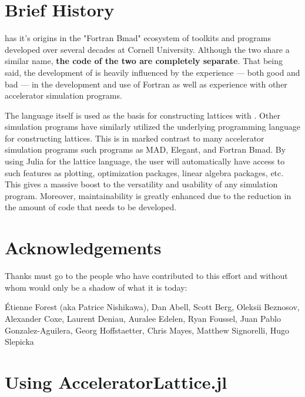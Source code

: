 \section{Brief History}

\bmadjl has it's origins in the "Fortran Bmad"\cite{Sagan:Bmad2006} ecosystem of toolkits and programs developed over several
decades at Cornell University. Although the two share a similar name, {\bf the code of the two are
completely separate}. That being said, the development of \accellat is heavily influenced by the 
experience --- both good and bad --- in the development and use of Fortran \bmad as well as experience
with other accelerator simulation programs.

The \julia language itself is used as the basis for constructing lattices with \accellat. 
Other simulation programs
have similarly utilized the underlying programming language for constructing 
lattices\cite{Appleby:Merlin2020,Iadarola:Xsuite2023}. This is in marked contrast to many accelerator
simulation programs such programs as MAD\cite{Grote:MAD1989}, Elegant\cite{Borland:Elegant2000}, and
Fortran Bmad. 
By using Julia for the lattice language, the user will automatically have access to such features 
as plotting, optimization packages, linear algebra packages, etc. 
This gives a massive boost to the versatility and usability of any \bmadjl simulation program.
Moreover, maintainability is greatly enhanced due to the reduction in the amount of code that needs
to be developed.

\section{Acknowledgements}

Thanks must go to the people who have contributed to this effort and without
whom \bmadjl would only be a shadow of what it is today: 

\'Etienne Forest (aka Patrice Nishikawa),
Dan Abell,
Scott Berg,
Oleksii Beznosov,
Alexander Coxe,
Laurent Deniau,
Auralee Edelen,
Ryan Foussel,
Juan Pablo Gonzalez-Aguilera,
Georg Hoffstaetter,
Chris Mayes,
Matthew Signorelli,
Hugo Slepicka

\section{Using AcceleratorLattice.jl}

